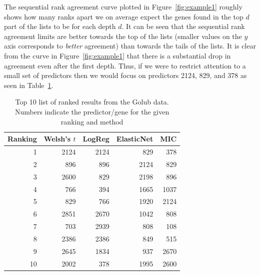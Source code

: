 \documentclass[12pt,a4paper]{article}
\theoremstyle{plain}
\begin{document}
The sequential rank agreement curve plotted in Figure~\ref{fig:example1}
roughly shows how many ranks apart we on average expect the genes found in the
top $d$ part of the lists to be for each depth $d$.  It can be seen
that the sequential rank agreement limits are better towards the top
of the lists (smaller values on the $y$ axis corresponds to
\emph{better} agreement) than towards the tails of the lists. It is clear
from the curve in Figure~\ref{fig:example1} that there is a
substantial drop in agreement even after the first depth. Thus, if we
were to restrict attention to a small set of predictors then we would
focus on predictors 2124, 829, and 378 as seen in Table~\ref{tab1}.


\begin{table}[tb]
\centering
\caption{Top 10 list of ranked results from the Golub data. Numbers indicate the predictor/gene for the given ranking and method} 
\label{tab1}
\begin{tabular}{rrrrr}
  \hline
Ranking & Welsh's $t$ & LogReg & ElasticNet & MIC \\ 
  \hline
1 & 2124 & 2124 & 829 & 378 \\ 
  2 & 896 & 896 & 2124 & 829 \\ 
  3 & 2600 & 829 & 2198 & 896 \\ 
  4 & 766 & 394 & 1665 & 1037 \\ 
  5 & 829 & 766 & 1920 & 2124 \\ 
  6 & 2851 & 2670 & 1042 & 808 \\ 
  7 & 703 & 2939 & 808 & 108 \\ 
  8 & 2386 & 2386 & 849 & 515 \\ 
  9 & 2645 & 1834 & 937 & 2670 \\ 
  10 & 2002 & 378 & 1995 & 2600 \\ 
   \hline
\end{tabular}
\end{table}

\end{document}
